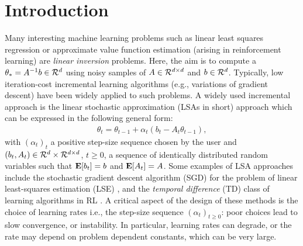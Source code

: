 \section{Introduction}\label{sec:intro}
Many interesting machine learning problems such as linear least squares regression or approximate value function estimation (arising in reinforcement learning) are \emph{linear inversion} problems. Here, the aim is to compute a $\theta_*=A^{-1}b \in \mathcal{R}^d$ using noisy samples of $A\in \mathcal{R}^{d \times d}$ and $b\in \mathcal{R}^{d}$. Typically, low iteration-cost incremental learning algorithms (e.g., variations of gradient descent) have been widely applied to such problems. A widely used incremental approach is the linear stochastic approximation (LSAs in short) approach which can be expressed in the following general form:
\begin{align}\label{eq:lsaintro}
\theta_t=\theta_{t-1}+\alpha_t (b_t-A_t \theta_{t-1}),
\end{align}
with $(\alpha_t)_t$ a positive step-size sequence chosen by the user and 
$(b_t,A_t)\in \mathcal{R}^d\times \mathcal{R}^{d \times d}$,  $t\geq 0$, a sequence of identically distributed random variables such that $\mathbf{E}[b_t]=b$ and $\mathbf{E}[A_t]=A$. Some examples of LSA approaches include the stochastic gradient descent algorithm (SGD) for the problem of linear least-squares estimation  (LSE) \cite{bach,bachaistats}, and the \emph{temporal difference} (TD) class of learning algorithms in RL \cite{sutton,konda-tsitsiklis,KoTsi03:LSA,gtd,gtd2,gtdmp}.
 A critical aspect of the design of these methods is the choice of learning rates i.e., the step-size sequence $(\alpha_t)_{t\geq 0}$: poor choices lead to slow convergence, or instability. In particular, learning rates can degrade, or the rate may depend on problem dependent constants, which can be very large. 
